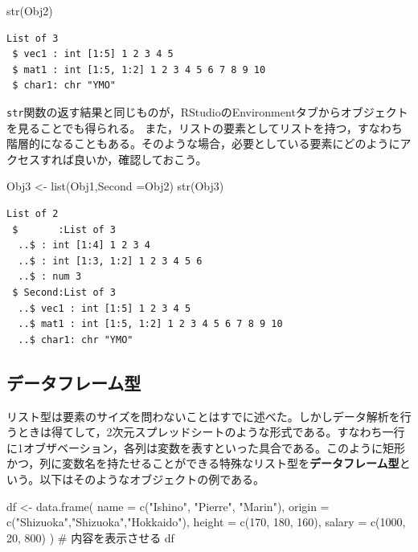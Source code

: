 \documentclass[
  a4paper,
]{ltjsbook}
\newenvironment{Shaded}{\begin{snugshade}}{\end{snugshade}}
\newcommand{\AttributeTok}[1]{\textcolor[rgb]{0.40,0.45,0.13}{#1}}
\newcommand{\CommentTok}[1]{\textcolor[rgb]{0.37,0.37,0.37}{#1}}
\newcommand{\DecValTok}[1]{\textcolor[rgb]{0.68,0.00,0.00}{#1}}
\newcommand{\FunctionTok}[1]{\textcolor[rgb]{0.28,0.35,0.67}{#1}}
\newcommand{\NormalTok}[1]{\textcolor[rgb]{0.00,0.23,0.31}{#1}}
\newcommand{\OtherTok}[1]{\textcolor[rgb]{0.00,0.23,0.31}{#1}}
\newcommand{\StringTok}[1]{\textcolor[rgb]{0.13,0.47,0.30}{#1}}
\begin{document}
\begin{Shaded}
\begin{Highlighting}[]
\FunctionTok{str}\NormalTok{(Obj2)}
\end{Highlighting}
\end{Shaded}

\begin{verbatim}
List of 3
 $ vec1 : int [1:5] 1 2 3 4 5
 $ mat1 : int [1:5, 1:2] 1 2 3 4 5 6 7 8 9 10
 $ char1: chr "YMO"
\end{verbatim}

\texttt{str}関数の返す結果と同じものが，RStudioのEnvironmentタブからオブジェクトを見ることでも得られる。
また，リストの要素としてリストを持つ，すなわち階層的になることもある。そのような場合，必要としている要素にどのようにアクセスすれば良いか，確認しておこう。

\begin{Shaded}
\begin{Highlighting}[]
\NormalTok{Obj3 }\OtherTok{\textless{}{-}} \FunctionTok{list}\NormalTok{(Obj1,}\AttributeTok{Second =}\NormalTok{Obj2)}
\FunctionTok{str}\NormalTok{(Obj3)}
\end{Highlighting}
\end{Shaded}

\begin{verbatim}
List of 2
 $       :List of 3
  ..$ : int [1:4] 1 2 3 4
  ..$ : int [1:3, 1:2] 1 2 3 4 5 6
  ..$ : num 3
 $ Second:List of 3
  ..$ vec1 : int [1:5] 1 2 3 4 5
  ..$ mat1 : int [1:5, 1:2] 1 2 3 4 5 6 7 8 9 10
  ..$ char1: chr "YMO"
\end{verbatim}

\subsection{データフレーム型}\label{ux30c7ux30fcux30bfux30d5ux30ecux30fcux30e0ux578b}

リスト型は要素のサイズを問わないことはすでに述べた。しかしデータ解析を行うときは得てして，2次元スプレッドシートのような形式である。すなわち一行に1オブザベーション，各列は変数を表すといった具合である。このように矩形かつ，列に変数名を持たせることができる特殊なリスト型を\textbf{データフレーム型}という。以下はそのようなオブジェクトの例である。

\begin{Shaded}
\begin{Highlighting}[]
\NormalTok{df }\OtherTok{\textless{}{-}} \FunctionTok{data.frame}\NormalTok{(}
  \AttributeTok{name =} \FunctionTok{c}\NormalTok{(}\StringTok{"Ishino"}\NormalTok{, }\StringTok{"Pierre"}\NormalTok{, }\StringTok{"Marin"}\NormalTok{),}
  \AttributeTok{origin =} \FunctionTok{c}\NormalTok{(}\StringTok{"Shizuoka"}\NormalTok{,}\StringTok{"Shizuoka"}\NormalTok{,}\StringTok{"Hokkaido"}\NormalTok{),}
  \AttributeTok{height =} \FunctionTok{c}\NormalTok{(}\DecValTok{170}\NormalTok{, }\DecValTok{180}\NormalTok{, }\DecValTok{160}\NormalTok{),}
  \AttributeTok{salary =} \FunctionTok{c}\NormalTok{(}\DecValTok{1000}\NormalTok{, }\DecValTok{20}\NormalTok{, }\DecValTok{800}\NormalTok{)}
\NormalTok{)}
\CommentTok{\# 内容を表示させる}
\NormalTok{df}
\end{Highlighting}
\end{Shaded}
\end{document}
